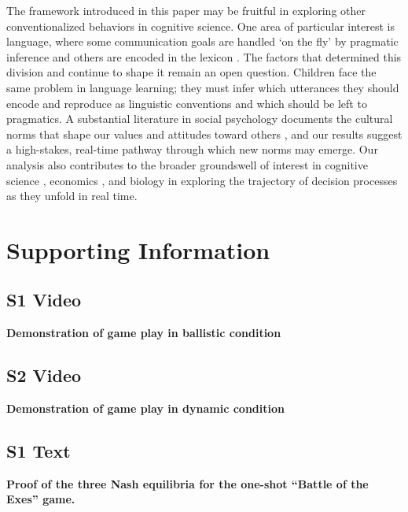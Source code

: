 \documentclass[10pt,letterpaper]{article}
\begin{document}
The framework introduced in this paper may be fruitful in exploring other conventionalized behaviors in cognitive science. One area of particular interest is language, where some communication goals are handled `on the fly' by pragmatic inference and others are encoded in the lexicon \cite{Grice75_LogicConversation, GarrodDoherty94_GroupConventionsLinguistics}. The factors that determined this division and continue to shape it remain an open question. Children face the same problem in language learning; they must infer which utterances they should encode and reproduce as linguistic conventions and which should be left to pragmatics. A substantial literature in social psychology documents the cultural norms that shape our values and attitudes toward others \cite{Bicchieri05_DynamicsSocialNorms}, and our results suggest a high-stakes, real-time pathway through which new norms may emerge. Our analysis also contributes to the broader groundswell of interest in cognitive science \cite{SpiveyDale06, KoopJohnson11, Beer00}, economics \cite{OpreaCharnessFriedman14_ContinuousTime, FriedmanOprea12_ContinuousDilemma}, and biology \cite{vanDoornRiebliTaborsky14_CoactionReciprocityContinuousTime} in exploring the trajectory of decision processes as they unfold in real time. 

\section*{Supporting Information}

\subsection*{S1 Video}
\label{S1_Video}
{\bf Demonstration of game play in ballistic condition}

\subsection*{S2 Video}
\label{S2_Video}
{\bf Demonstration of game play in dynamic condition}

\subsection*{S1 Text}
\label{S1_Text}
{\bf Proof of the three Nash equilibria for the one-shot ``Battle of the Exes'' game.}  
\end{document}
